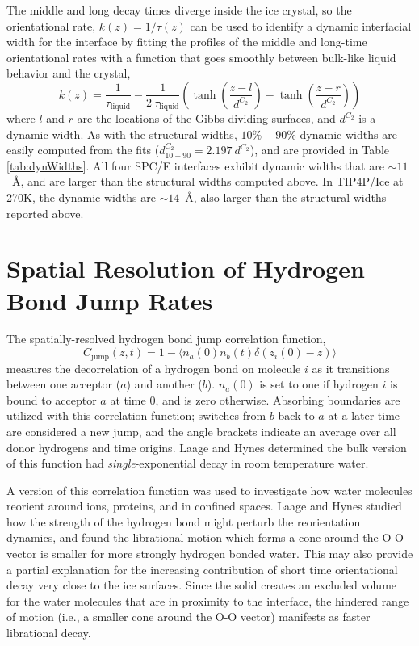 The middle and long decay times diverge inside the ice crystal, so the
orientational rate, $k(z) = 1 / \tau(z)$ can be used to identify a
dynamic interfacial width for the interface by fitting the profiles of
the middle and long-time orientational rates with a function that goes
smoothly between bulk-like liquid behavior and the crystal,
\begin{equation}\label{tauFit}
  k(z) = \frac{1}{\tau_\mathrm{liquid}} - \frac{1}{2~\tau_\mathrm{liquid}} \left(
      \tanh \left( \frac{z-l}{d^{C_2}} \right) - \tanh \left( \frac{z-r}{d^{C_2}} \right) \right)
\end{equation}
where $l$ and $r$ are the locations of the Gibbs dividing surfaces,
and $d^{C_2}$ is a dynamic width.  As with the structural widths,
$10\%-90\%$ dynamic widths are easily computed from the fits
($d_\mathrm{10-90}^{C_2} = 2.197~d^{C_2}$), and are provided in Table
\ref{tab:dynWidths}. All four SPC/E interfaces exhibit dynamic widths
that are $\sim 11$~\AA, and are larger than the structural widths
computed above.  In TIP4P/Ice at 270K, the dynamic widths are
$\sim 14$~\AA, also larger than the structural widths reported above.
 
\section{Spatial Resolution of Hydrogen Bond Jump Rates}
The spatially-resolved hydrogen bond jump correlation function,
\begin{equation}\label{jump}
C_\mathrm{jump}(z,t) = 1 - \langle n_a(0) n_b(t) \delta(z_i(0) - z) \rangle
\end{equation}
measures the decorrelation of a hydrogen bond on molecule $i$ as it
transitions between one acceptor ($a$) and another ($b$). $n_a(0)$ is
set to one if hydrogen $i$ is bound to acceptor $a$ at time $0$, and
is zero otherwise.  Absorbing boundaries are utilized with this
correlation function; switches from $b$ back to $a$ at a later time
are considered a new jump, and the angle brackets indicate an average
over all donor hydrogens and time origins. Laage and Hynes determined
the bulk version of this function had \textit{single}-exponential
decay in room temperature water.

A version of this correlation function was used to investigate how
water molecules reorient around
ions\cite{Laage2007,Laage2008a,Stirnemann2011a,Laage2011},
proteins\cite{Duboue-Dijon2014}, and in confined
spaces\cite{Laage2012b,Fogarty2014}.  Laage and Hynes studied how the
strength of the hydrogen bond might perturb the reorientation
dynamics,\cite{Laage2006a} and found the librational motion which
forms a cone around the O-O vector is smaller for more strongly
hydrogen bonded water. This may also provide a partial explanation for
the increasing contribution of short time orientational decay very
close to the ice surfaces.  Since the solid creates an excluded volume
for the water molecules that are in proximity to the interface, the
hindered range of motion (i.e., a smaller cone around the O-O vector)
manifests as faster librational decay.


